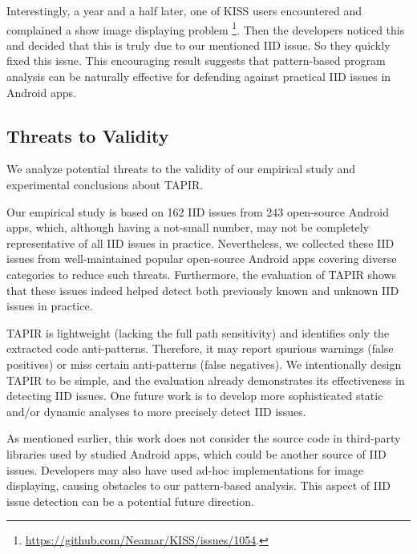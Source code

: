 Interestingly, a year and a half later, one of KISS users encountered and complained a show image displaying problem%
\footnote{\url{https://github.com/Neamar/KISS/issues/1054}.}.
Then the developers noticed this and decided that this is truly due to our mentioned IID issue. So they quickly fixed this issue.
This encouraging result suggests that pattern-based program analysis can be naturally effective for defending against practical IID issues in Android apps.

\subsection{Threats to Validity} \label{subsec:threats}

We analyze potential threats to the validity of our empirical study and experimental conclusions about TAPIR.

Our empirical study is based on 162 IID issues from 243 open-source Android apps,
which, although having a not-small number, may not be completely representative of all IID issues in practice.
Nevertheless, we collected these IID issues from well-maintained popular open-source Android apps covering diverse categories to reduce such threats.
Furthermore, the evaluation of TAPIR shows that these issues indeed helped detect both previously known and unknown IID issues in practice.

TAPIR is lightweight (lacking the full path sensitivity) and identifies only the extracted code anti-patterns.
Therefore, it may report spurious warnings (false positives) or miss certain anti-patterns (false negatives).
We intentionally design TAPIR to be simple,
and the evaluation already demonstrates its effectiveness in detecting IID issues.
One future work is to develop more sophisticated static and/or dynamic analyses to more precisely detect IID issues.

As mentioned earlier, this work does not consider the source code in third-party libraries used by studied Android apps,
which could be another source of IID issues.
Developers may also have used ad-hoc implementations for image displaying,
causing obstacles to our pattern-based analysis.
This aspect of IID issue detection can be a potential future direction.